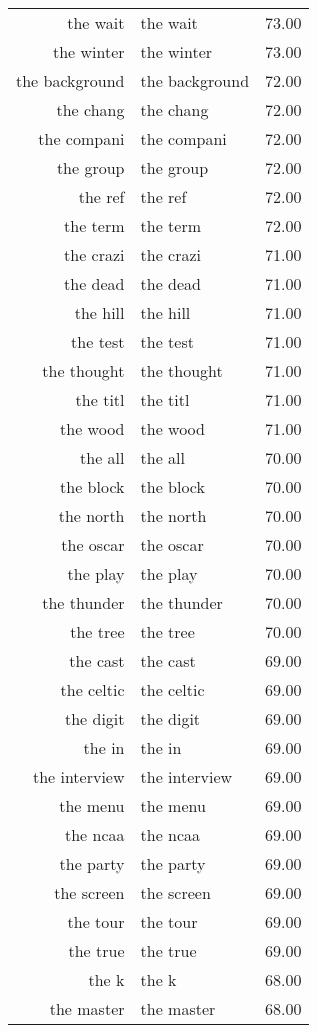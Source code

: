 \begin{table}[ht]
\begin{tabular}{rlr}
  the wait & the wait & 73.00 \\ 
  the winter & the winter & 73.00 \\ 
  the background & the background & 72.00 \\ 
  the chang & the chang & 72.00 \\ 
  the compani & the compani & 72.00 \\ 
  the group & the group & 72.00 \\ 
  the ref & the ref & 72.00 \\ 
  the term & the term & 72.00 \\ 
  the crazi & the crazi & 71.00 \\ 
  the dead & the dead & 71.00 \\ 
  the hill & the hill & 71.00 \\ 
  the test & the test & 71.00 \\ 
  the thought & the thought & 71.00 \\ 
  the titl & the titl & 71.00 \\ 
  the wood & the wood & 71.00 \\ 
  the all & the all & 70.00 \\ 
  the block & the block & 70.00 \\ 
  the north & the north & 70.00 \\ 
  the oscar & the oscar & 70.00 \\ 
  the play & the play & 70.00 \\ 
  the thunder & the thunder & 70.00 \\ 
  the tree & the tree & 70.00 \\ 
  the cast & the cast & 69.00 \\ 
  the celtic & the celtic & 69.00 \\ 
  the digit & the digit & 69.00 \\ 
  the in & the in & 69.00 \\ 
  the interview & the interview & 69.00 \\ 
  the menu & the menu & 69.00 \\ 
  the ncaa & the ncaa & 69.00 \\ 
  the party & the party & 69.00 \\ 
  the screen & the screen & 69.00 \\ 
  the tour & the tour & 69.00 \\ 
  the true & the true & 69.00 \\ 
  the k & the k & 68.00 \\ 
  the master & the master & 68.00 \\ 

\end{tabular}
\end{table}
